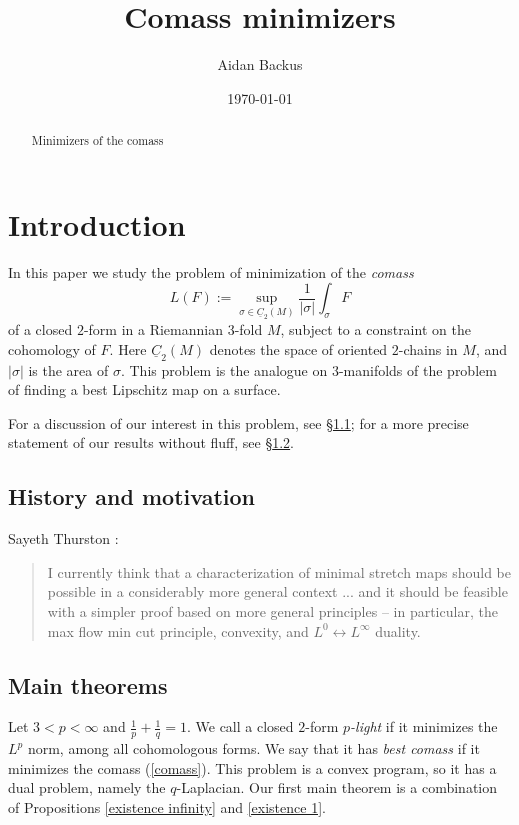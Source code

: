 \documentclass[reqno,11pt]{amsart}
\title{Comass minimizers}
\author{Aidan Backus}
\date{\today}
\newcommand{\Chain}{\underline C}
\newcommand{\dfn}[1]{\emph{#1}\index{#1}}
\theoremstyle{definition}
\numberwithin{equation}{section}
\begin{document}
\begin{abstract}
	Minimizers of the comass
\end{abstract}

\maketitle

\section{Introduction}
In this paper we study the problem of minimization of the \dfn{comass}
\begin{equation}\label{comass}
L(F) := \sup_{\sigma \in \Chain_2(M)} \frac{1}{|\sigma|} \int_\sigma F
\end{equation}
of a closed $2$-form in a Riemannian $3$-fold $M$, subject to a constraint on the cohomology of $F$.
Here $\Chain_2(M)$ denotes the space of oriented $2$-chains in $M$, and $|\sigma|$ is the area of $\sigma$.
This problem is the analogue on $3$-manifolds of the problem of finding a best Lipschitz map on a surface.

For a discussion of our interest in this problem, see \S\ref{motivation}; for a more precise statement of our results without fluff, see \S\ref{results}.

\subsection{History and motivation} \label{motivation}

Sayeth Thurston \cite[Abstract]{Thurston98}:
\begin{quote}
I currently think that a characterization of minimal stretch maps should be possible in a considerably more general context ... and it should be feasible with a simpler proof based on more general principles -- in particular, the max flow min cut principle, convexity, and $L^0 \leftrightarrow L^\infty$ duality.
\end{quote}

\subsection{Main theorems} \label{results}
Let $3 < p < \infty$ and $\frac{1}{p} + \frac{1}{q} = 1$.
We call a closed $2$-form \dfn{$p$-light} if it minimizes the $L^p$ norm, among all cohomologous forms.
We say that it has \dfn{best comass} if it minimizes the comass (\ref{comass}).
This problem is a convex program, so it has a dual problem, namely the $q$-Laplacian.
Our first main theorem is a combination of Propositions \ref{existence infinity} and \ref{existence 1}.
\end{document}
